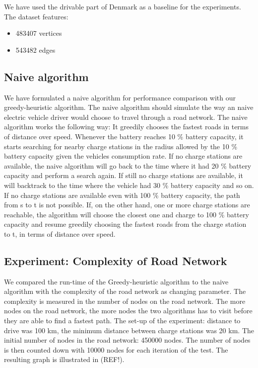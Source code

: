 We have used the drivable part of Denmark as a baseline for the experiments. The dataset features:
\begin{itemize}
    \item 483407 vertices
    \item 543482 edges
\end{itemize}

\subsection{Naive algorithm}
\label{sub:naivealgorithm}
We have formulated a naive algorithm for performance comparison with our greedy-heuristic algorithm. The naive algorithm should simulate the way an naive electric vehicle driver would choose to travel through a road network. The naive algorithm works the following way: It greedily chooses the fastest roads in terms of distance over speed. Whenever the battery reaches 10 \% battery capacity, it starts searching for nearby charge stations in the radius allowed by the 10 \% battery capacity given the vehicles consumption rate. If no charge stations are available, the naive algorithm will go back to the time where it had 20 \% battery capacity and perform a search again. If still no charge stations are available, it will backtrack to the time where the vehicle had 30 \% battery capacity and so on. If no charge stations are available even with 100 \% battery capacity, the path from s to t is not possible. If, on the other hand, one or more charge stations are reachable, the algorithm will choose the closest one and charge to 100 \% battery capacity and resume greedily choosing the fastest roads from the charge station to t, in terms of distance over speed.

\subsection{Experiment: Complexity of Road Network}

We compared the run-time of the Greedy-heuristic algorithm to the naive algorithm with the complexity of the road network as changing parameter. The
complexity is measured in the number of nodes on the road network. The more nodes on the road network, the more nodes the two algorithms has 
to visit before they are able to find a fastest path. The set-up of the experiment: distance to drive was 100 km, the minimum distance between 
charge stations was 20 km. The initial number of nodes in the road network: 450000 nodes. The number of nodes is then counted down with 10000 nodes 
for each iteration of the test. The resulting graph is illustrated in (REF!).

